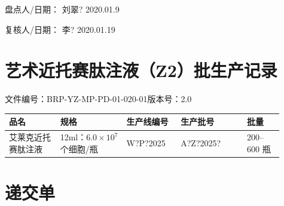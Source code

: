 \documentclass[UTF8,10pt,a4paper,fontset=fandol]{ctexart}
\newcommand{\fieldvalue}[1]{#1}
\newcommand{\handwritten}[1]{#1}
\begin{document}
\par\medskip

盘点人/日期：
\fieldvalue{\handwritten{刘翠?}}
\qquad
\fieldvalue{\handwritten{2020.01.9}}

\par\medskip

复核人/日期：
\fieldvalue{\handwritten{李?}}
\qquad
\fieldvalue{\handwritten{2020.01.19}}


\newpage

\section{艺术近托赛肽注液（Z2）批生产记录}

\noindent
文件编号：BRP-YZ-MP-PD-01-020-01\hfill 版本号：2.0

\begin{center}
\begin{tabular}{|p{0.17\linewidth}|p{0.22\linewidth}|p{0.18\linewidth}|p{0.22\linewidth}|p{0.12\linewidth}|}
\hline
品名 & 规格 & 生产线编号 & 生产批号 & 批量\\
\hline
\fieldvalue{艾莱克近托赛肽注液} &
\fieldvalue{12ml：$6.0\times10^{7}$个细胞/瓶} &
\fieldvalue{\handwritten{W?P?2025}} &
\fieldvalue{\handwritten{A?Z?2025?}} &
\fieldvalue{200--600 瓶}\\
\hline
\end{tabular}
\end{center}

\section*{递交单}
\end{document}
